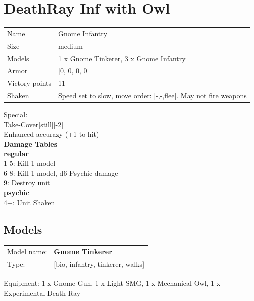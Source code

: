  















\clearpage

\section{ DeathRay Inf with Owl }

\begin{tabular}{ll}
  Name & Gnome Infantry \\
  Size & medium\\
  Models & 1 x Gnome Tinkerer, 3 x Gnome Infantry\\
  Armor & [0, 0, 0, 0]\\
  Victory points & 11\\
  Shaken & Speed set to slow, move order: [-,-,flee]. May not fire weapons\\
\end{tabular}
Special: \\
Take-Cover[still][-2]\\ 
Enhanced accurazy (+1 to hit) \\ 


{\bf Damage Tables} \\
 {\bf regular } \\
1-5: Kill 1 model \\
6-8: Kill 1 model, d6 Psychic damage \\
9: Destroy unit \\
 {\bf psychic } \\
4+: Unit Shaken \\


\clearpage

\subsection{ Models }

\begin{tabular}{ll}
Model name: & {\bf Gnome Tinkerer } \\
Type: & [bio, infantry, tinkerer, walks] \\
\end{tabular}

Equipment: 1 x Gnome Gun, 1 x Light SMG, 1 x Mechanical Owl, 1 x Experimental Death Ray \\

